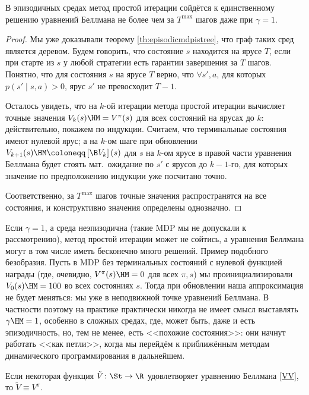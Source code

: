 \begin{theoremBox}[label=th:policyevalepisodic]{}
В эпизодичных средах метод простой итерации сойдётся к единственному решению уравнений Беллмана не более чем за $T^{\max}$ шагов даже при $\gamma = 1$.
\begin{proof}
Мы уже доказывали теорему \ref{th:episodicmdpistree}, что граф таких сред является деревом. Будем говорить, что состояние $s$ находится на ярусе $T$, если при старте из $s$ у любой стратегии есть гарантии завершения за $T$ шагов. Понятно, что для состояния $s$ на ярусе $T$ верно, что $\forall s', a$, для которых $p(s' \mid s, a) > 0$, ярус $s'$ не превосходит $T - 1$. 

Осталось увидеть, что на $k$-ой итерации метода простой итерации вычисляет точные значения $V_k(s) \HM= V^{\pi}(s)$ для всех состояний на ярусах до $k$: действительно, покажем по индукции. Считаем, что терминальные состояния имеют нулевой ярус; а на $k$-ом шаге при обновлении $V_{k+1}(s) \HM\coloneqq \left[\B V_k\right](s)$ для $s$ на $k$-ом ярусе в правой части уравнения Беллмана будет стоять мат.~ожидание по $s'$ с ярусов до $k - 1$-го, для которых значение по предположению индукции уже посчитано точно.

Соответственно, за $T^{\max}$ шагов точные значения распространятся на все состояния, и конструктивно значения определены однозначно.
\end{proof}
\end{theoremBox}

\begin{remark}
Если $\gamma = 1$, а среда неэпизодична (такие MDP мы не допускали к рассмотрению), метод простой итерации может не сойтись, а уравнения Беллмана могут в том числе иметь бесконечно много решений. Пример подобного безобразия. Пусть в MDP без терминальных состояний с нулевой функцией награды (где, очевидно, $V^{\pi}(s) \HM= 0$ для всех $\pi, s$) мы проинициализировали $V_0(s) \HM= 100$ во всех состояниях $s$. Тогда при обновлении наша аппроксимация не будет меняться: мы уже в неподвижной точке уравнений Беллмана. В частности поэтому на практике практически никогда не имеет смысл выставлять $\gamma \HM = 1$, особенно в сложных средах, где, может быть, даже и есть эпизодичность, но, тем не менее, есть <<похожие состояния>>: они начнут работать <<как петли>>, когда мы перейдём к приближённым методам динамического программирования в дальнейшем.
\end{remark}

\begin{proposition}
Если некоторая функция $\tilde{V} \colon \St \to \R$ удовлетворяет уравнению Беллмана \eqref{VV}, то $\tilde{V} \equiv V^\pi$.
\end{proposition}

